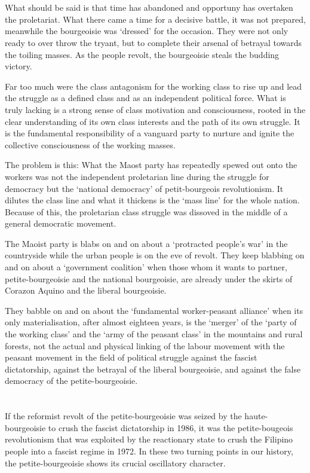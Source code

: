 \section{}
What should be said is that
time has abandoned and opportuny has overtaken
the proletariat.
What there came a time for a decisive battle, 
it was not prepared,
meanwhile the bourgeoisie was `dressed' for the occasion.
They were not only ready to over throw the tryant,
but to complete their arsenal of betrayal towards the toiling masses.
As the people revolt, 
the bourgeoisie steals the budding victory.

Far too much 
were the class antagonism 
for the working class to rise up 
and lead the struggle as a defined class 
and as an independent political force. 
What is truly lacking 
is a strong sense of class motivation and consciousness, 
rooted in the clear understanding 
of its own class interests and the path of its own struggle. 
It is the fundamental responsibility of a vanguard party 
to nurture and ignite the collective consciousness 
of the working masses.

The problem is this:
What the Maost party 
has repeatedly spewed out onto the workers
was not the independent proletarian line 
during the struggle for democracy
but the `national democracy'
of petit-bourgeois revolutionism.
It dilutes the class line 
and what it thickens is the `mass line'
for the whole nation. 
Because of this, 
the proletarian class struggle was dissoved
in the middle of a general democratic movement.

The Maoist party is blabs on and on 
about a `protracted people's war' in the countryside 
while the urban people is on the eve of revolt. 
They keep blabbing on and on about a `government coalition'
when those whom it wants to partner, 
petite-bourgeoisie and the national bourgeoisie,
are already under the skirts of Corazon Aquino and the liberal bourgeoisie.


They babble on and on about the `fundamental worker-peasant alliance'
when its only materialisation,
after almost eighteen years, 
is the `merger' of the `party of the working class' 
and the `army of the peasant class' in the mountains and rural forests,
not the actual and physical linking 
of the labour movement with the peasant movement 
in the field of political struggle against the fascist dictatorship, 
against the betrayal of the liberal bourgeoisie, 
and against the false democracy of the petite-bourgeoisie.


\section{}
If the reformist revolt of the petite-bourgeoisie 
was seized by the haute-bourgeoisie
to crush the fascist dictatorship in 1986,
it was the petite-bougeois revolutionism 
that was exploited
by the reactionary state 
to crush the Filipino people 
into a fascist regime in 1972.
In these two turning points in our history,
the petite-bourgeoisie shows its crucial oscillatory character.

